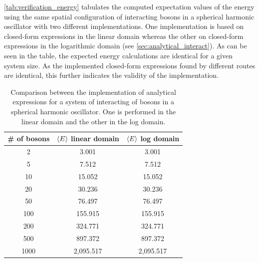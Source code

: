 \autoref{tab:verification_energy} tabulates the computed expectation values of the energy using the same spatial configuration of interacting bosons in a spherical harmonic oscillator with two different implementations. One implementation is based on closed-form expressions in the linear domain whereas the other on closed-form expressions in the logarithmic domain (see \autoref{sec:analytical_interact}). As can be seen in the table, the expected energy calculations are identical for a given system size. As the implemented closed-form expressions found by different routes are identical, this further indicates the validity of the implementation.

\begin{table}[!htb]
\caption{Comparison between the implementation of analytical expressions for a system of interacting of bosons in a spherical harmonic oscillator. One is performed in the linear domain and the other in the log domain.}
\centering
{}
\begin{tabular}{ccc}
\hline
\hline 
\# of bosons & $\expval{E}$ linear domain & $\expval{E}$ log domain
\\
\hline 
\hline 
                   2 &         3.001 &                    3.001 \\
                   5 &         7.512 &                    7.512 \\
                  10 &        15.052 &                   15.052 \\
                  20 &        30.236 &                   30.236 \\
                  50 &        76.497 &                   76.497 \\
                 100 &       155.915 &                  155.915 \\
                 200 &       324.771 &                  324.771 \\
                 500 &       897.372 &                  897.372 \\
                1000 &     2,095.517 &                2,095.517 \\
\hline
\end{tabular}
\label{tab:verification_energy}
\end{table}

